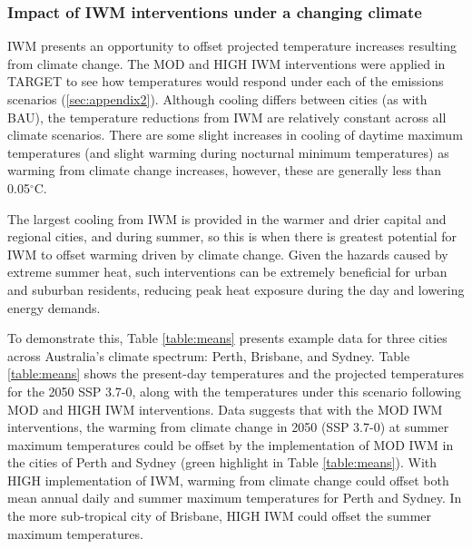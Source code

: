 \documentclass[utf8]{frontiersSCNS} %
\begin{document}
\subsubsection{Impact of IWM interventions under a changing climate}\label{sec:results3b}

IWM presents an opportunity to offset projected temperature increases resulting from climate change. The MOD and HIGH IWM interventions were applied in TARGET to see how temperatures would respond under each of the emissions scenarios (\ref{sec:appendix2}). Although cooling differs between cities (as with BAU), the temperature reductions from IWM are relatively constant across all climate scenarios. There are some slight increases in cooling of daytime maximum temperatures (and slight warming during nocturnal minimum temperatures) as warming from climate change increases, however, these are generally less than 0.05$^{\circ}$C.

The largest cooling from IWM is provided in the warmer and drier capital and regional cities, and during summer, so this is when there is greatest potential for IWM to offset warming driven by climate change. Given the hazards caused by extreme summer heat, such interventions can be extremely beneficial for urban and suburban residents, reducing peak heat exposure during the day and lowering energy demands. 

To demonstrate this, Table \ref{table:means} presents example data for three cities across Australia’s climate spectrum: Perth, Brisbane, and Sydney. Table \ref{table:means} shows the present-day temperatures and the projected temperatures for the 2050 SSP 3.7-0, along with the temperatures under this scenario following MOD and HIGH IWM interventions. Data suggests that with the MOD IWM interventions, the warming from climate change in 2050 (SSP 3.7-0) at summer maximum temperatures could be offset by the implementation of MOD IWM in the cities of Perth and Sydney (green highlight in Table \ref{table:means}). With HIGH implementation of IWM, warming from climate change could offset both mean annual daily and summer maximum temperatures for Perth and Sydney. In the more sub-tropical city of Brisbane, HIGH IWM could offset the summer maximum temperatures.
\end{document}
